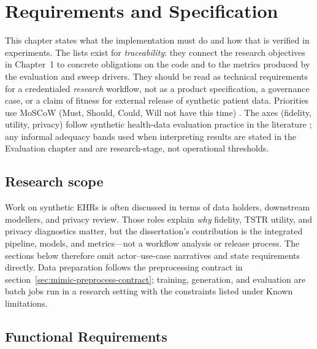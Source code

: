 \chapter{Requirements and Specification}

This chapter states what the implementation must do and how that is verified in experiments. The lists exist for \emph{traceability}: they connect the research objectives in Chapter~1 to concrete obligations on the code and to the metrics produced by the evaluation and sweep drivers. They should be read as technical requirements for a credentialed \emph{research} workflow, not as a product specification, a governance case, or a claim of fitness for external release of synthetic patient data. Priorities use MoSCoW (Must, Should, Could, Will not have this time) \cite{agileBusinessConsortiumMoSCoW}. The axes (fidelity, utility, privacy) follow synthetic health-data evaluation practice in the literature \cite{yan2022benchmarking,kaabachi2025scoping}; any informal adequacy bands used when interpreting results are stated in the Evaluation chapter and are research-stage, not operational thresholds.

\section{Research scope}

Work on synthetic EHRs is often discussed in terms of data holders, downstream modellers, and privacy review. Those roles explain \emph{why} fidelity, TSTR utility, and privacy diagnostics matter, but the dissertation's contribution is the integrated pipeline, models, and metrics---not a workflow analysis or release process. The sections below therefore omit actor--use-case narratives and state requirements directly. Data preparation follows the preprocessing contract in section~\ref{sec:mimic-preprocess-contract}; training, generation, and evaluation are batch jobs run in a research setting with the constraints listed under Known limitations.

\section{Functional Requirements}

